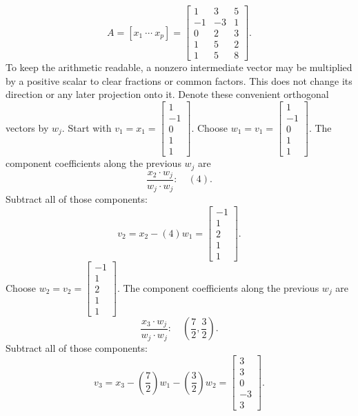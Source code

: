 \[A=[x_1\ \cdots\ x_p]=\left[\begin{array}{rrr}1&3&5\\-1&-3&1\\0&2&3\\1&5&2\\1&5&8\end{array}\right].\]
To keep the arithmetic readable, a nonzero intermediate vector may be multiplied by a positive scalar to clear fractions or common factors. This does not change its direction or any later projection onto it. Denote these convenient orthogonal vectors by $w_j$.
Start with $v_1=x_1=\left[\begin{array}{r}1\\-1\\0\\1\\1\end{array}\right]$.
Choose $w_{1}=v_{1}=\left[\begin{array}{r}1\\-1\\0\\1\\1\end{array}\right]$.
The component coefficients along the previous $w_j$ are
\[\frac{x_{2}\cdot w_j}{w_j\cdot w_j}:\quad(4).\]
Subtract all of those components:
\[v_{2}=x_{2}-(4)w_{1}=\left[\begin{array}{r}-1\\1\\2\\1\\1\end{array}\right].\]
Choose $w_{2}=v_{2}=\left[\begin{array}{r}-1\\1\\2\\1\\1\end{array}\right]$.
The component coefficients along the previous $w_j$ are
\[\frac{x_{3}\cdot w_j}{w_j\cdot w_j}:\quad(\frac{7}{2},\frac{3}{2}).\]
Subtract all of those components:
\[v_{3}=x_{3}-(\frac{7}{2})w_{1}-(\frac{3}{2})w_{2}=\left[\begin{array}{r}3\\3\\0\\-3\\3\end{array}\right].\]
